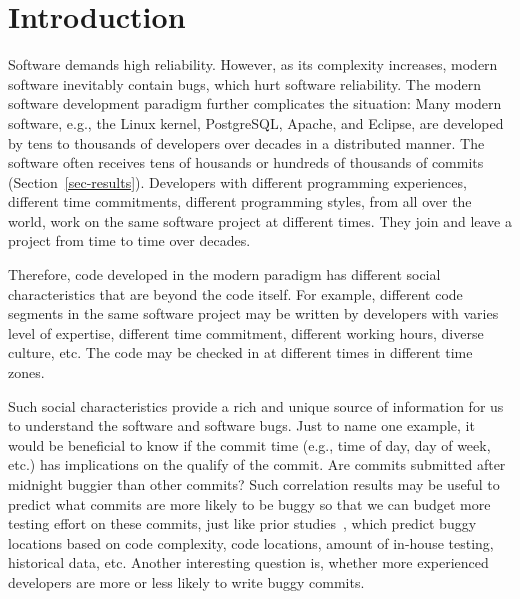 \section{Introduction}

Software demands high reliability. However, as its complexity increases, 
modern software inevitably contain bugs, which hurt software reliability.
The modern software development paradigm further complicates the situation: 
Many modern software, e.g., the Linux kernel, PostgreSQL, Apache, and Eclipse, 
are developed by tens to thousands of developers over decades %
in a distributed manner. The software often receives tens of housands or hundreds of thousands 
of commits (Section~\ref{sec-results}). 
Developers with different programming experiences, 
different time commitments, different programming styles, from all over the world,
work on the same software project at different times. They join and leave a project 
from time to time over decades.

Therefore, code developed in the modern paradigm has different social characteristics 
that are beyond the code itself. For example, different code segments in the same
software project may be written by developers with  
varies level of expertise, different time 
commitment, different working hours, diverse culture, etc.
The code may be checked in at different times in different time zones. 

Such social characteristics provide a rich and unique source of information for us to 
understand the software and software bugs. Just to name one example, it would be beneficial to know if  
the commit time (e.g., time of day, day of week, etc.) has implications on the qualify of the commit. 
Are commits submitted after midnight buggier than other commits? 
Such correlation results may be useful to predict what commits are more likely
to be buggy so that we can budget more testing effort on these commits, just
like prior studies~\cite{graves00predicting, guo04robust, ostrand05predicting, zimmermann-promise-2007,predictionMenzies10},
which predict buggy locations based on code complexity, 
code locations, amount of in-house testing, historical data, etc. 
Another interesting question is, whether more experienced developers are more or less
likely to write buggy commits. 


